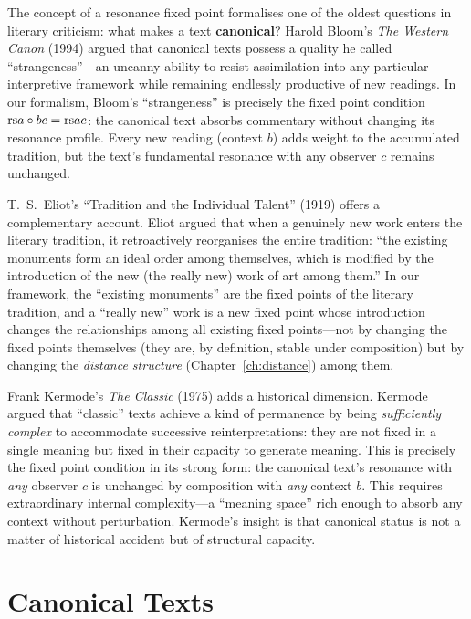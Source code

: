\begin{interpretation}
\label{interp:ch10:bloom_western_canon}
The concept of a resonance fixed point formalises one of the oldest questions
in literary criticism: what makes a text \textbf{canonical}?  Harold Bloom's
\emph{The Western Canon} (1994) argued that canonical texts possess a quality
he called ``strangeness''---an uncanny ability to resist assimilation into any
particular interpretive framework while remaining endlessly productive of new
readings.  In our formalism, Bloom's ``strangeness'' is precisely the fixed
point condition $\mathrm{rs}{a \circ b}{c} = \mathrm{rs}{a}{c}$: the canonical text
absorbs commentary without changing its resonance profile.  Every new reading
(context $b$) adds weight to the accumulated tradition, but the text's
fundamental resonance with any observer $c$ remains unchanged.

T.~S.\ Eliot's ``Tradition and the Individual Talent'' (1919) offers a
complementary account.  Eliot argued that when a genuinely new work enters
the literary tradition, it retroactively reorganises the entire tradition:
``the existing monuments form an ideal order among themselves, which is
modified by the introduction of the new (the really new) work of art among
them.''  In our framework, the ``existing monuments'' are the fixed points
of the literary tradition, and a ``really new'' work is a new fixed point
whose introduction changes the relationships among all existing fixed
points---not by changing the fixed points themselves (they are, by definition,
stable under composition) but by changing the \emph{distance structure}
(Chapter~\ref{ch:distance}) among them.

Frank Kermode's \emph{The Classic} (1975) adds a historical dimension.
Kermode argued that ``classic'' texts achieve a kind of permanence by
being \emph{sufficiently complex} to accommodate successive reinterpretations:
they are not fixed in a single meaning but fixed in their capacity to
generate meaning.  This is precisely the fixed point condition in its strong
form: the canonical text's resonance with \emph{any} observer $c$ is
unchanged by composition with \emph{any} context $b$.  This requires
extraordinary internal complexity---a ``meaning space'' rich enough to
absorb any context without perturbation.  Kermode's insight is that canonical
status is not a matter of historical accident but of structural capacity.
\end{interpretation}



\section{Canonical Texts}


